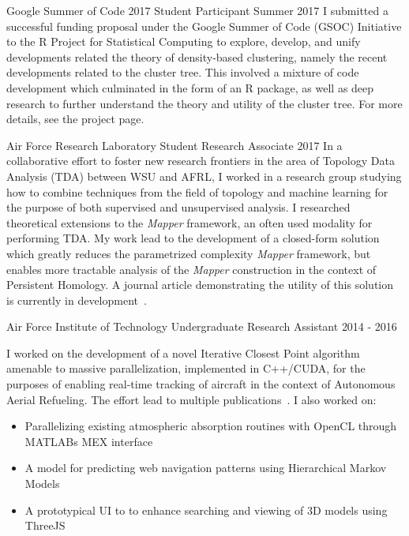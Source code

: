 \documentclass[11pt,a4paper,sans]{moderncv} %
\begin{document}

			 {Google Summer of Code 2017}
			 {Student Participant}
			 {Summer 2017}{}{\vspace{3pt} %
			 I submitted a successful funding proposal under the Google Summer of Code (GSOC) Initiative to the R Project for Statistical Computing to explore, develop, and unify developments related the theory of density-based clustering, namely the recent developments related to the cluster tree. This involved a mixture of code development which culminated in the form of an R package, as well as deep research to further understand the theory and utility of the cluster tree. For more details, see the project page\footnotemark. 
			 } 

			 {Air Force Research Laboratory}
			 {Student Research Associate}
			 {2017}{}{\vspace{3pt}
			 In a collaborative effort to foster new research frontiers in the area of Topology Data Analysis (TDA) between WSU and AFRL, I worked in a research group studying how to combine techniques from  the field of topology and machine learning for the purpose of both supervised and unsupervised analysis. I researched theoretical extensions to the \textit{Mapper} framework, an often used modality for performing TDA. 
			 My work lead to the development of a closed-form solution which greatly reduces the parametrized complexity \textit{Mapper} framework, but enables more tractable analysis of the \textit{Mapper} construction in the context of Persistent Homology. A journal article demonstrating the utility of this solution is currently in development~\cite{mapperext}. 
}

			 {Air Force Institute of Technology}
			 {Undergraduate Research Assistant}
			 {2014 - 2016}{}{\vspace{3pt}
I worked on the development of a novel Iterative Closest Point algorithm amenable to massive parallelization, implemented in C++/CUDA, for the purposes of enabling real-time tracking of aircraft in the context of Autonomous Aerial Refueling. The effort lead to multiple publications~\cite{piekenbrock2016automated, robinson2016parallelized}. I also worked on:
\begin{itemize}
	\item Parallelizing existing atmospheric absorption routines with OpenCL through MATLABs MEX interface
	\item A model for predicting web navigation patterns using Hierarchical Markov Models
	\item A prototypical UI to to enhance searching and viewing of 3D models using ThreeJS
\end{itemize}
}
\end{document}
